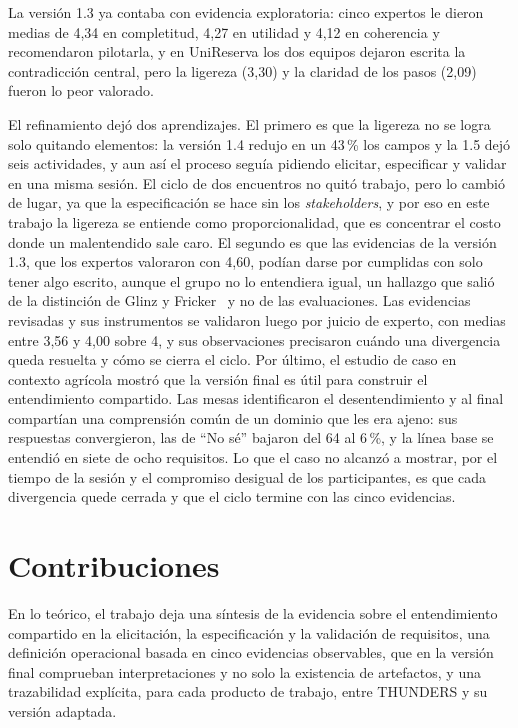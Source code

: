 \documentclass[12pt,letterpaper,oneside]{report}
\begin{document}
La versión 1.3 ya contaba con evidencia exploratoria: cinco expertos le dieron
medias de 4,34 en completitud, 4,27 en utilidad y 4,12 en coherencia y
recomendaron pilotarla, y en UniReserva
los dos equipos dejaron escrita la contradicción central, pero la ligereza
(3,30) y la claridad de los pasos (2,09) fueron lo peor valorado.

El refinamiento dejó dos aprendizajes. El primero es que la ligereza no se logra
solo quitando elementos: la versión 1.4 redujo en un 43\,\% los campos y la 1.5 dejó seis actividades, y
aun así el proceso seguía pidiendo elicitar, especificar y
validar en una misma sesión. El ciclo de dos encuentros no quitó trabajo, pero
lo cambió de lugar, ya que la especificación se hace sin los
\textit{stakeholders}, y por eso en este trabajo la ligereza se entiende como
proporcionalidad, que es concentrar el costo donde un malentendido sale caro. El
segundo es que las evidencias de la versión 1.3, que los expertos valoraron con
4,60, podían darse por cumplidas con solo tener algo escrito, aunque el grupo no
lo entendiera igual, un hallazgo que salió de la distinción de Glinz y
Fricker~\cite{glinz2015shared} y no de las evaluaciones. Las evidencias revisadas y sus
instrumentos se validaron luego por juicio de experto, con medias entre 3,56 y
4,00 sobre 4, y sus observaciones precisaron cuándo una divergencia queda
resuelta y cómo se cierra el ciclo. Por último, el estudio de caso en contexto agrícola
mostró que la versión final es útil para construir el entendimiento compartido.
Las mesas identificaron el desentendimiento y al final compartían una
comprensión común de un dominio que les era ajeno: sus respuestas convergieron,
las de ``No sé'' bajaron del 64 al 6\,\%, y la línea base se entendió en siete
de ocho requisitos. Lo que el caso no alcanzó a mostrar, por el tiempo de la
sesión y el compromiso desigual de los participantes, es que cada divergencia
quede cerrada y que el ciclo termine con las cinco evidencias.

\section{Contribuciones}
En lo teórico, el trabajo deja una síntesis de la evidencia sobre el entendimiento compartido
en la elicitación, la especificación y la validación de requisitos, una definición operacional
basada en cinco evidencias observables, que en la versión final comprueban
interpretaciones y no solo la existencia de artefactos, y una trazabilidad
explícita, para cada producto de trabajo, entre THUNDERS y su versión adaptada.
\end{document}
